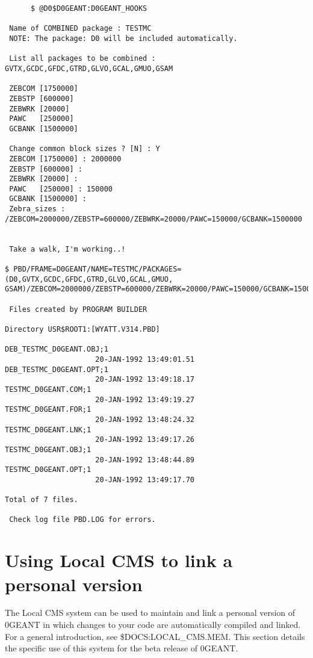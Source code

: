 \begin{verbatim}
      $ @D0$D0GEANT:D0GEANT_HOOKS

 Name of COMBINED package : TESTMC
 NOTE: The package: D0 will be included automatically.

 List all packages to be combined : GVTX,GCDC,GFDC,GTRD,GLVO,GCAL,GMUO,GSAM

 ZEBCOM [1750000]
 ZEBSTP [600000]
 ZEBWRK [20000]
 PAWC   [250000]
 GCBANK [1500000]

 Change common block sizes ? [N] : Y
 ZEBCOM [1750000] : 2000000
 ZEBSTP [600000] :
 ZEBWRK [20000] :
 PAWC   [250000] : 150000
 GCBANK [1500000] :
 Zebra_sizes : /ZEBCOM=2000000/ZEBSTP=600000/ZEBWRK=20000/PAWC=150000/GCBANK=1500000


 Take a walk, I'm working..!

$ PBD/FRAME=D0GEANT/NAME=TESTMC/PACKAGES=(D0,GVTX,GCDC,GFDC,GTRD,GLVO,GCAL,GMUO,
GSAM)/ZEBCOM=2000000/ZEBSTP=600000/ZEBWRK=20000/PAWC=150000/GCBANK=1500000

 Files created by PROGRAM BUILDER

Directory USR$ROOT1:[WYATT.V314.PBD]

DEB_TESTMC_D0GEANT.OBJ;1
                     20-JAN-1992 13:49:01.51
DEB_TESTMC_D0GEANT.OPT;1
                     20-JAN-1992 13:49:18.17
TESTMC_D0GEANT.COM;1
                     20-JAN-1992 13:49:19.27
TESTMC_D0GEANT.FOR;1
                     20-JAN-1992 13:48:24.32
TESTMC_D0GEANT.LNK;1
                     20-JAN-1992 13:49:17.26
TESTMC_D0GEANT.OBJ;1
                     20-JAN-1992 13:48:44.89
TESTMC_D0GEANT.OPT;1
                     20-JAN-1992 13:49:17.70

Total of 7 files.

 Check log file PBD.LOG for errors.
\end{verbatim}

\section{Using Local CMS to link a personal version}
\label{betacms}

The  Local CMS system can be used to maintain and link a personal
version of \D0GEANT in which changes to your code are automatically
compiled and linked.  For a general introduction, see \$DOCS:LOCAL\_CMS.MEM.
This section details the specific use of this system for the beta release of
\D0GEANT.


